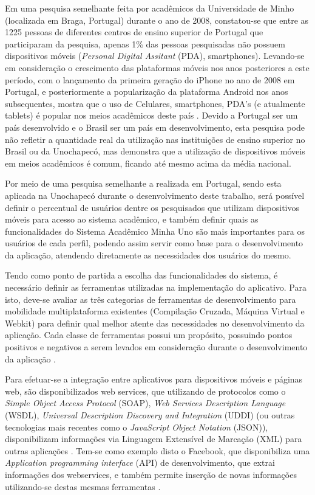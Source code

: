 Em uma pesquisa semelhante feita por acadêmicos da Universidade de Minho (localizada em Braga, Portugal) durante o ano de 2008, constatou-se que entre as 1225 pessoas de diferentes centros de ensino superior de Portugal que participaram da pesquisa, apenas 1\% das pessoas pesquisadas não possuem dispositivos móveis (\emph{Personal Digital Assitant} (PDA), smartphones). Levando-se em consideração o crescimento das plataformas móveis nos anos posteriores a este período, com o lançamento da primeira geração do iPhone no ano de 2008 em Portugal, e posteriormente a popularização da plataforma Android nos anos subsequentes, mostra que o uso de Celulares, smartphones, PDA's (e atualmente tablets) é popular nos meios acadêmicos deste país \cite{UsoTecnologiasMoveisEstudantesPortugueses}. Devido a Portugal ser um país desenvolvido e o Brasil ser um país em desenvolvimento, esta pesquisa pode não refletir a quantidade real da utilização nas instituições de ensino superior no Brasil ou da Unochapecó, mas demonstra que a utilização de dispositivos móveis em meios acadêmicos é comum, ficando até mesmo acima da média nacional. 

Por meio de uma pesquisa semelhante a realizada em Portugal, sendo esta aplicada na Unochapecó durante o desenvolvimento deste trabalho, será possível definir o percentual de usuários dentre os pesquisados que utilizam dispositivos móveis para acesso ao sistema acadêmico, e também definir quais as funcionalidades do Sistema Acadêmico Minha Uno são mais importantes para os usuários de cada perfil, podendo assim servir como base para o desenvolvimento da aplicação, atendendo diretamente as necessidades dos usuários do mesmo.

Tendo como ponto de partida a escolha das funcionalidades do sistema, é necessário definir as ferramentas utilizadas na implementação do aplicativo. Para isto, deve-se avaliar as três categorias de ferramentas de desenvolvimento para mobilidade multiplataforma existentes (Compilação Cruzada, Máquina Virtual e Webkit) para definir qual melhor atente das necessidades no desenvolvimento da aplicação. Cada classe de ferramentas possui um propósito, possuindo pontos positivos e negativos a serem levados em consideração durante o desenvolvimento da aplicação \cite{CrossPlatformMobileDevelopment2011}.

Para efetuar-se a integração entre aplicativos para dispositivos móveis e páginas web, são disponibilizados web services, que utilizando de protocolos como o \emph{Simple Object Access Protocol} (SOAP), \emph{Web Services Description Language} (WSDL), \emph{Universal Description Discovery and Integration} (UDDI) (ou outras tecnologias mais recentes como o \emph{JavaScript Object Notation} (JSON)), disponibilizam informações via Linguagem Extensível de Marcação (XML) para outras aplicações \cite{WebApplicationArchitecture}.  Tem-se como exemplo disto o Facebook, que disponibiliza uma \emph{Application programming interface} (API) de desenvolvimento, que extrai informações dos webservices, e também permite inserção de novas informações utilizando-se destas mesmas ferramentas \cite{Facebook}.




